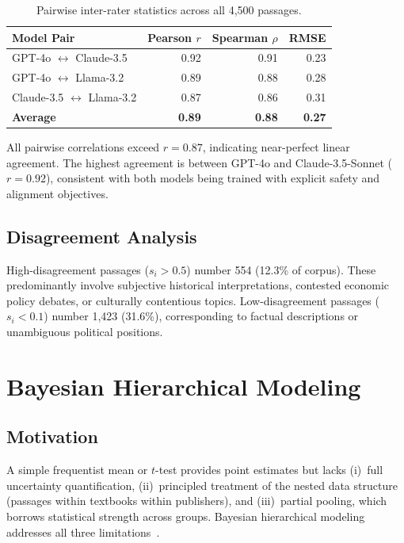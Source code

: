 \documentclass[10pt,letterpaper]{article}
\begin{document}
\begin{table}[h]
\centering
\caption{Pairwise inter-rater statistics across all 4,500 passages.}
\label{tab:pairwise_corr}
\begin{tabular}{lrrr}
\toprule
\textbf{Model Pair} & \textbf{Pearson $r$} & \textbf{Spearman $\rho$} & \textbf{RMSE} \\
\midrule
GPT-4o $\leftrightarrow$ Claude-3.5     & 0.92 & 0.91 & 0.23 \\
GPT-4o $\leftrightarrow$ Llama-3.2      & 0.89 & 0.88 & 0.28 \\
Claude-3.5 $\leftrightarrow$ Llama-3.2  & 0.87 & 0.86 & 0.31 \\
\midrule
\textbf{Average} & \textbf{0.89} & \textbf{0.88} & \textbf{0.27} \\
\bottomrule
\end{tabular}
\end{table}

All pairwise correlations exceed $r = 0.87$, indicating near-perfect linear
agreement.  The highest agreement is between GPT-4o and Claude-3.5-Sonnet
($r = 0.92$), consistent with both models being trained with explicit safety and
alignment objectives.

\subsection{Disagreement Analysis}

High-disagreement passages ($s_i > 0.5$) number 554 (12.3\% of corpus).  These
predominantly involve subjective historical interpretations, contested economic
policy debates, or culturally contentious topics.  Low-disagreement passages
($s_i < 0.1$) number 1,423 (31.6\%), corresponding to factual descriptions or
unambiguous political positions.

\section{Bayesian Hierarchical Modeling}
\label{sec:bayes}

\subsection{Motivation}

A simple frequentist mean or $t$-test provides point estimates but lacks
(i)~full uncertainty quantification, (ii)~principled treatment of the nested
data structure (passages within textbooks within publishers), and (iii)~partial
pooling, which borrows statistical strength across groups.  Bayesian hierarchical
modeling addresses all three limitations~\citep{gelman2020bda,
mcelreath2024rethinking}.
\end{document}
